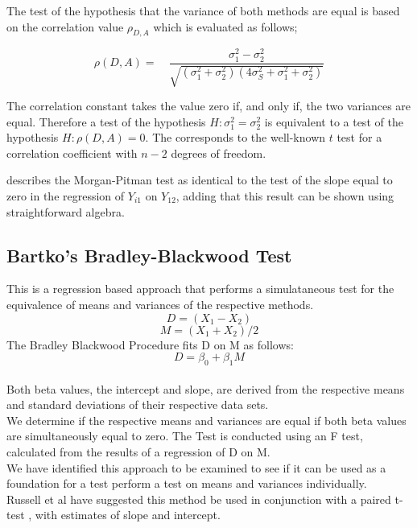 \documentclass[12pt, a4paper]{article}
\begin{document}
	The test of the hypothesis that the variance of both methods are
	equal is based on the correlation value $\rho_{D,A}$ which is
	evaluated as follows;
	
	\begin{equation}
		\rho(D,A)=\quad\frac{\sigma^{2}_{1}-\sigma^{2}_{2}}{\sqrt{(\sigma^{2}_{1}+\sigma^{2}_{2})(4\sigma^{2}_{S}+\sigma^{2}_{1}+\sigma^{2}_{2})}}
	\end{equation}
	
	The correlation constant takes the value zero if, and only if, the
	two variances are equal. Therefore a test of the hypothesis $H:
	\sigma^{2}_{1}=\sigma^{2}_{2}$ is equivalent to a test of the
	hypothesis $H: \rho(D,A) = 0$. The corresponds to the well-known
	$t$ test for a correlation coefficient with $n-2$ degrees of
	freedom.
	
	\citet{Bartko} describes the Morgan-Pitman test as identical to
	the test of the slope equal to zero in the regression of $Y_{i1}$
	on $Y_{12}$, adding that this result can be shown using
	straightforward algebra.
	
	\subsection{Bartko's Bradley-Blackwood Test}
	This is a regression based approach that performs a simulataneous
	test for the equivalence of means and variances of the respective
	methods.\\
	\begin{equation}
		D = (X_{1}-X_{2})
	\end{equation}
	\begin{equation}
		M = (X_{1} + X_{2}) /2
	\end{equation}
	The Bradley Blackwood Procedure fits D on M as follows:\\
	\begin{equation}
		D = \beta_{0} + \beta_{1}M
	\end{equation}
	\\Both beta values, the intercept and slope, are derived from the respective means and
	standard deviations of their respective data sets.\\
	We determine if the respective means and variances are equal if
	both beta values are simultaneously equal to zero. The Test is
	conducted using an F test, calculated from the results of a
	regression of D on M.
	\\We have identified this approach  to be examined to see if it can
	be used as a foundation for a test perform a test on means and
	variances individually.\\
	Russell et al have suggested this method be used in conjunction
	with a paired t-test , with estimates of slope and intercept.
	
\end{document}
